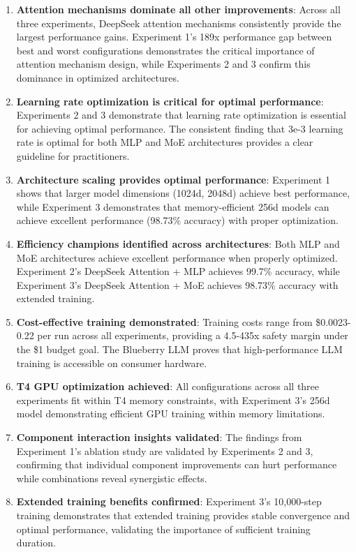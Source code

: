 \documentclass[11pt,a4paper]{article}
\begin{document}
\begin{enumerate}
    \item \textbf{Attention mechanisms dominate all other improvements}: Across all three experiments, DeepSeek attention mechanisms consistently provide the largest performance gains. Experiment 1's 189x performance gap between best and worst configurations demonstrates the critical importance of attention mechanism design, while Experiments 2 and 3 confirm this dominance in optimized architectures.
    
    \item \textbf{Learning rate optimization is critical for optimal performance}: Experiments 2 and 3 demonstrate that learning rate optimization is essential for achieving optimal performance. The consistent finding that 3e-3 learning rate is optimal for both MLP and MoE architectures provides a clear guideline for practitioners.
    
    \item \textbf{Architecture scaling provides optimal performance}: Experiment 1 shows that larger model dimensions (1024d, 2048d) achieve best performance, while Experiment 3 demonstrates that memory-efficient 256d models can achieve excellent performance (98.73\% accuracy) with proper optimization.
    
    \item \textbf{Efficiency champions identified across architectures}: Both MLP and MoE architectures achieve excellent performance when properly optimized. Experiment 2's DeepSeek Attention + MLP achieves 99.7\% accuracy, while Experiment 3's DeepSeek Attention + MoE achieves 98.73\% accuracy with extended training.
    
    \item \textbf{Cost-effective training demonstrated}: Training costs range from \$0.0023-0.22 per run across all experiments, providing a 4.5-435x safety margin under the \$1 budget goal. The Blueberry LLM proves that high-performance LLM training is accessible on consumer hardware.
    
    \item \textbf{T4 GPU optimization achieved}: All configurations across all three experiments fit within T4 memory constraints, with Experiment 3's 256d model demonstrating efficient GPU training within memory limitations.
    
    \item \textbf{Component interaction insights validated}: The findings from Experiment 1's ablation study are validated by Experiments 2 and 3, confirming that individual component improvements can hurt performance while combinations reveal synergistic effects.
    
    \item \textbf{Extended training benefits confirmed}: Experiment 3's 10,000-step training demonstrates that extended training provides stable convergence and optimal performance, validating the importance of sufficient training duration.
\end{enumerate}
\end{document}
